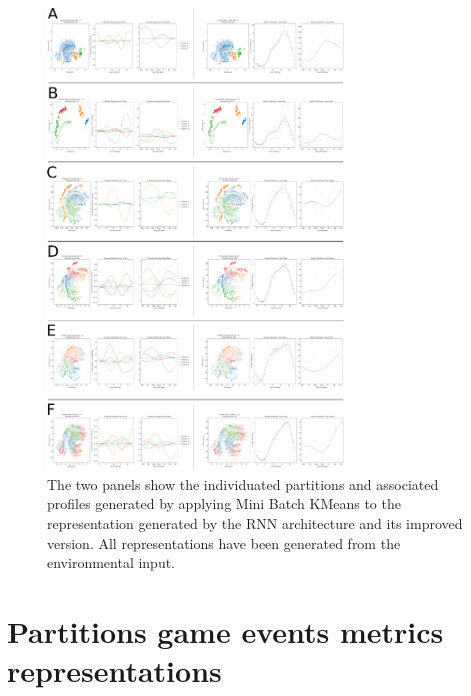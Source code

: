 \begin{figure}[ht]
\includegraphics[width=0.7\textwidth]{images/appendix_D/clust_env_all.png}
\centering
\caption[Partitions of the representations generated by the RNN architecture and its improved versio from the environmental metrics]{The two panels show the individuated partitions and associated profiles generated by applying Mini Batch KMeans to the representation generated by the RNN architecture and its improved version. All representations have been generated from the environmental input.}
\label{partition_rnn_env} 
\end{figure}
\FloatBarrier

\section{Partitions game events metrics representations}
\label{partitions_game_events}
